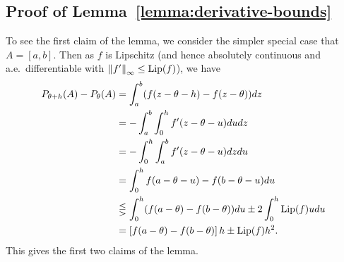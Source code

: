 




\subsection{Proof of Lemma~\ref{lemma:derivative-bounds}}
\label{sec:proof-derivative-bounds}

To see the first claim of the lemma, we consider the simpler special case
that $A = [a, b]$. Then as $f$ is Lipschitz (and hence absolutely
continuous and a.e.\ differentiable with $\left\|{f'}\right\|_\infty \le {\rm \textup{Lip}}(f)$),
we have
\begin{align*}
  P_{\theta + h}(A)
  - P_\theta(A)
  & = \int_a^b (f(z - \theta - h) - f(z - \theta)) dz \\
  & = -\int_a^b \int_0^h f'(z - \theta - u) du dz \\
  & = -\int_0^h \int_a^b f'(z - \theta - u) dz du \\
  & = \int_0^h f(a - \theta - u) - f(b - \theta - u) du \\
  & \lesseqgtr \int_0^h (f(a - \theta) - f(b - \theta)) du
  \pm 2 \int_0^h {\rm \textup{Lip}}(f) u du \\
  & = \left[f(a - \theta) - f(b - \theta)\right] h \pm {\rm \textup{Lip}}(f) h^2.
\end{align*}
This gives the first two claims of the lemma.

